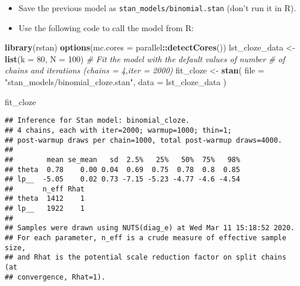 \documentclass[12pt,ignorenonframetext,aspectratio=169]{beamer}
\newenvironment{Shaded}{\begin{snugshade}}{\end{snugshade}}
\newcommand{\CommentTok}[1]{\textcolor[rgb]{0.56,0.35,0.01}{\textit{#1}}}
\newcommand{\DataTypeTok}[1]{\textcolor[rgb]{0.13,0.29,0.53}{#1}}
\newcommand{\DecValTok}[1]{\textcolor[rgb]{0.00,0.00,0.81}{#1}}
\newcommand{\KeywordTok}[1]{\textcolor[rgb]{0.13,0.29,0.53}{\textbf{#1}}}
\newcommand{\NormalTok}[1]{#1}
\newcommand{\OperatorTok}[1]{\textcolor[rgb]{0.81,0.36,0.00}{\textbf{#1}}}
\newcommand{\StringTok}[1]{\textcolor[rgb]{0.31,0.60,0.02}{#1}}
\providecommand{\tightlist}{%
  \setlength{\itemsep}{0pt}\setlength{\parskip}{0pt}}
\begin{document}
\begin{frame}[fragile]

\begin{itemize}
\tightlist
\item
  Save the previous model as \texttt{stan\_models/binomial.stan} (don't run it in R).
\item
  Use the following code to call the model from R:
\end{itemize}

\begin{Shaded}
\begin{Highlighting}[]
\KeywordTok{library}\NormalTok{(rstan)}
\KeywordTok{options}\NormalTok{(}\DataTypeTok{mc.cores =}\NormalTok{ parallel}\OperatorTok{::}\KeywordTok{detectCores}\NormalTok{())}
\NormalTok{lst_cloze_data <-}\StringTok{ }\KeywordTok{list}\NormalTok{(}\DataTypeTok{k =} \DecValTok{80}\NormalTok{, }\DataTypeTok{N =} \DecValTok{100}\NormalTok{)}
\CommentTok{# Fit the model with the default values of number}
\CommentTok{# of chains and iterations (chains = 4,iter = 2000)}
\NormalTok{fit_cloze <-}\StringTok{ }\KeywordTok{stan}\NormalTok{(}
  \DataTypeTok{file =} \StringTok{"stan_models/binomial_cloze.stan"}\NormalTok{,}
  \DataTypeTok{data =}\NormalTok{ lst_cloze_data}
\NormalTok{)}
\end{Highlighting}
\end{Shaded}

\end{frame}

\begin{frame}[fragile]

\scriptsize

\begin{Shaded}
\begin{Highlighting}[]
\NormalTok{fit_cloze}
\end{Highlighting}
\end{Shaded}

\begin{verbatim}
## Inference for Stan model: binomial_cloze.
## 4 chains, each with iter=2000; warmup=1000; thin=1; 
## post-warmup draws per chain=1000, total post-warmup draws=4000.
## 
##        mean se_mean   sd  2.5%   25%   50%  75%   98%
## theta  0.78    0.00 0.04  0.69  0.75  0.78  0.8  0.85
## lp__  -5.05    0.02 0.73 -7.15 -5.23 -4.77 -4.6 -4.54
##       n_eff Rhat
## theta  1412    1
## lp__   1922    1
## 
## Samples were drawn using NUTS(diag_e) at Wed Mar 11 15:18:52 2020.
## For each parameter, n_eff is a crude measure of effective sample size,
## and Rhat is the potential scale reduction factor on split chains (at 
## convergence, Rhat=1).
\end{verbatim}

\normalsize

\end{frame}
\end{document}
